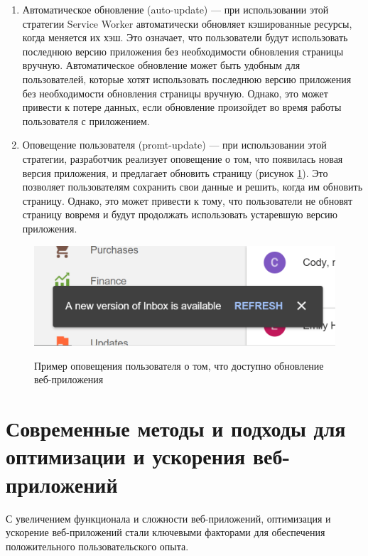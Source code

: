 \begin{enumerate} 
  \item Автоматическое обновление (auto-update)  — при использовании этой стратегии Service Worker автоматически обновляет кэшированные ресурсы, когда меняется их хэш. Это означает, что пользователи будут использовать последнюю версию приложения без необходимости обновления страницы вручную. Автоматическое обновление может быть удобным для пользователей, которые хотят использовать последнюю версию приложения без необходимости обновления страницы вручную. Однако, это может привести к потере данных, если обновление произойдет во время работы пользователя с приложением.
  
  \item Оповещение пользователя (promt-update)  — при использовании этой стратегии, разработчик реализует оповещение о том, что появилась новая версия приложения, и предлагает обновить страницу (рисунок \ref{fig:promt-uptate}). Это позволяет пользователям сохранить свои данные и решить, когда им обновить страницу. Однако, это может привести к тому, что пользователи не обновят страницу вовремя и будут продолжать использовать устаревшую версию приложения.  
\end{enumerate}

\begin{figure}[H]
\begin{center}
\includegraphics[width=1.0\hsize]{fig/service-worker-promt-uptate.png}\\[2mm]
\caption{Пример оповещения пользователя о том, что доступно обновление веб-приложения}\label{fig:promt-uptate}
\end{center}
\end{figure}

\section{Современные методы и подходы для оптимизации и ускорения веб-приложений}

С увеличением функционала и сложности веб-приложений, оптимизация и ускорение веб-приложений стали ключевыми факторами для обеспечения положительного пользовательского опыта.


